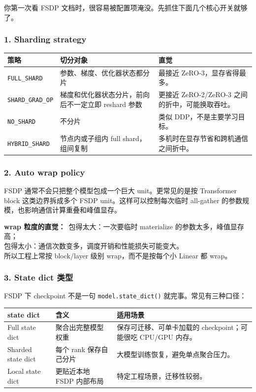你第一次看 FSDP 文档时，很容易被配置项淹没。先抓住下面几个核心开关就够了。

\subsubsection*{1. Sharding strategy}

\begin{center}
{\small
\begin{tabular}{p{3.7cm}p{4.7cm}p{4.3cm}}
\hline
\textbf{策略} & \textbf{切分对象} & \textbf{直觉} \\
\hline
\texttt{FULL\_SHARD} & 参数、梯度、优化器状态都分片 & 最接近 ZeRO-3，显存省得最多。 \\
\texttt{SHARD\_GRAD\_OP} & 梯度和优化器状态分片，前向后不一定立即 reshard 参数 & 更接近 ZeRO-2/ZeRO-3 之间的折中，可能换取吞吐。 \\
\texttt{NO\_SHARD} & 不分片 & 类似 DDP，不是主要学习目标。 \\
\texttt{HYBRID\_SHARD} & 节点内或子组内 full shard，组间复制 & 多机时在显存节省和跨机通信之间折中。 \\
\hline
\end{tabular}
}
\end{center}

\subsubsection*{2. Auto wrap policy}

FSDP 通常不会只把整个模型包成一个巨大 unit。更常见的是按 Transformer block 这类边界拆成多个 FSDP unit。这样可以控制每次临时 all-gather 的参数规模，也影响通信计算重叠和峰值显存。

\begin{intubox}
\textbf{wrap 粒度的直觉：}\
包得太大：一次要临时 materialize 的参数太多，峰值显存高；\\
包得太小：通信次数变多，调度开销和性能损失可能变大。\\
所以工程上常按 block/layer 级别 wrap，而不是按每个小 Linear 都 wrap。
\end{intubox}

\subsubsection*{3. State dict 类型}

FSDP 下 checkpoint 不是一句 \texttt{model.state\_dict()} 就完事。常见有三种口径：

\begin{center}
{\small
\begin{tabular}{p{3.5cm}p{4.8cm}p{4.3cm}}
\hline
\textbf{state dict} & \textbf{含义} & \textbf{适用场景} \\
\hline
Full state dict & 聚合出完整模型权重 & 保存可迁移、可单卡加载的 checkpoint；可能很吃 CPU/GPU 内存。 \\
Sharded state dict & 每个 rank 保存自己分片 & 大模型训练恢复，避免单点聚合压力。 \\
Local state dict & 更贴近本地 FSDP 内部布局 & 特定工程场景，迁移性较弱。 \\
\hline
\end{tabular}
}
\end{center}

